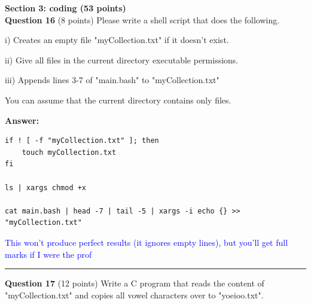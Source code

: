 \documentclass{exam}
\begin{document}
{\Large\textbf{Section 3: coding (53 points)}}
\\

\textbf{Question 16} (8 points) Please write a shell script that does the following.

i) Creates an empty file "myCollection.txt" if it doesn't exist.

ii) Give all files in the current directory executable permissions.

iii) Appends lines 3-7 of "main.bash" to "myCollection.txt"

You can assume that the current directory contains only files. 

\textbf{Answer:}

\begin{lstlisting}
if ! [ -f "myCollection.txt" ]; then
    touch myCollection.txt
fi

ls | xargs chmod +x 

cat main.bash | head -7 | tail -5 | xargs -i echo {} >> "myCollection.txt" 
\end{lstlisting}

\textcolor{blue}{This won't produce perfect results (it ignores empty lines), but you'll get full marks if I were the prof}

\newpage




\begin{center}\noindent\rule{6in}{0.4pt}\end{center}

\textbf{Question 17} (12 points) Write a C program that reads the content of "myCollection.txt" and copies all vowel characters over to "yoeioo.txt".
\end{document}

